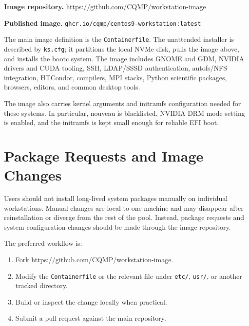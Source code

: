 \documentclass[11pt,a4paper]{article}
\newenvironment{keybox}[1]{%
  \begin{mdframed}[backgroundcolor=boxbg,linecolor=boxframe,linewidth=1pt,
    innertopmargin=6pt,innerbottommargin=6pt,
    innerrightmargin=8pt,innerleftmargin=8pt]
  \textbf{#1.}\quad}{\end{mdframed}}
\begin{document}
\begin{keybox}{Image repository}
\url{https://github.com/CQMP/workstation-image}
\end{keybox}

\begin{keybox}{Published image}
\texttt{ghcr.io/cqmp/centos9-workstation:latest}
\end{keybox}

The main image definition is the \texttt{Containerfile}.  The unattended
installer is described by \texttt{ks.cfg}; it partitions the local NVMe disk,
pulls the image above, and installs the bootc system.  The image includes GNOME
and GDM, NVIDIA drivers and CUDA tooling, SSH, LDAP/SSSD authentication,
autofs/NFS integration, HTCondor, compilers, MPI stacks, Python scientific
packages, browsers, editors, and common desktop tools.

The image also carries kernel arguments and initramfs configuration needed for
these systems.  In particular, nouveau is blacklisted, NVIDIA DRM mode setting
is enabled, and the initramfs is kept small enough for reliable EFI boot.

\section{Package Requests and Image Changes}
\label{sec:changes}

Users should not install long-lived system packages manually on individual
workstations.  Manual changes are local to one machine and may disappear after
reinstallation or diverge from the rest of the pool.  Instead, package requests
and system configuration changes should be made through the image repository.

The preferred workflow is:

\begin{enumerate}
  \item Fork \url{https://github.com/CQMP/workstation-image}.
  \item Modify the \texttt{Containerfile} or the relevant file under
        \texttt{etc/}, \texttt{usr/}, or another tracked directory.
  \item Build or inspect the change locally when practical.
  \item Submit a pull request against the main repository.
\end{enumerate}
\end{document}
